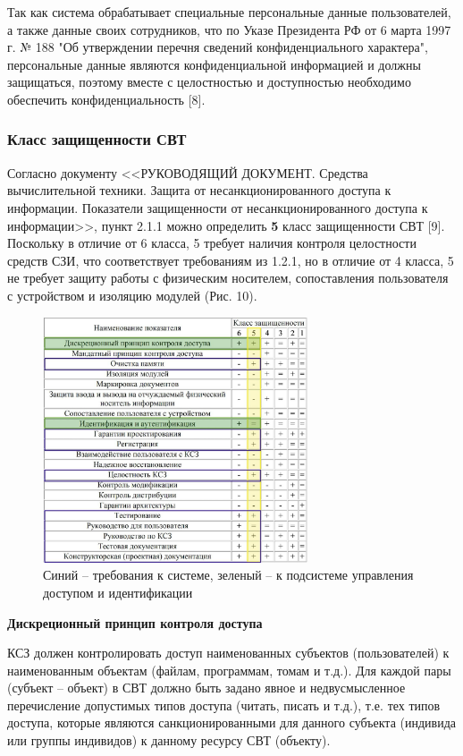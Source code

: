 Так как система обрабатывает специальные персональные данные пользователей, а также 
данные своих сотрудников, что по Указе Президента РФ от 6 марта 1997 г. № 188 
"Об утверждении перечня сведений конфиденциального характера", персональные данные являются конфиденциальной информацией 
и должны защищаться, поэтому вместе с целостностью и доступностью необходимо обеспечить конфиденциальность [8].

\subsubsection{Класс защищенности СВТ}

Согласно документу <<РУКОВОДЯЩИЙ ДОКУМЕНТ. Средства вычислительной техники.
Защита от несанкционированного доступа к информации. Показатели
защищенности от несанкционированного доступа к информации>>, пункт 2.1.1 можно 
определить \textbf{5} класс защищенности СВТ [9].
Поскольку в отличие от 6 класса, 5 требует наличия контроля целостности средств 
СЗИ, что соответствует требованиям 
из 1.2.1, но в отличие от 4 класса, 5 не требует защиту работы с физическим носителем,
 сопоставления пользователя с устройством и изоляцию модулей (Рис. 10).

\begin{figure}[H]
  \centering
  \includegraphics[width=0.7\textwidth]{pict/3}
  \caption{Синий -- требования к системе, зеленый -- к подсистеме управления доступом и идентификации}
  \label{fig:3}
\end{figure}

\textbf{Дискреционный принцип контроля доступа}

КСЗ должен контролировать доступ наименованных субъектов
(пользователей) к наименованным объектам (файлам, программам, томам и
т.д.). Для каждой пары (субъект – объект) в СВТ должно быть задано явное и
недвусмысленное перечисление допустимых типов доступа (читать, писать и
т.д.), т.е. тех типов доступа, которые являются санкционированными для
данного субъекта (индивида или группы индивидов) к данному ресурсу СВТ
(объекту).

